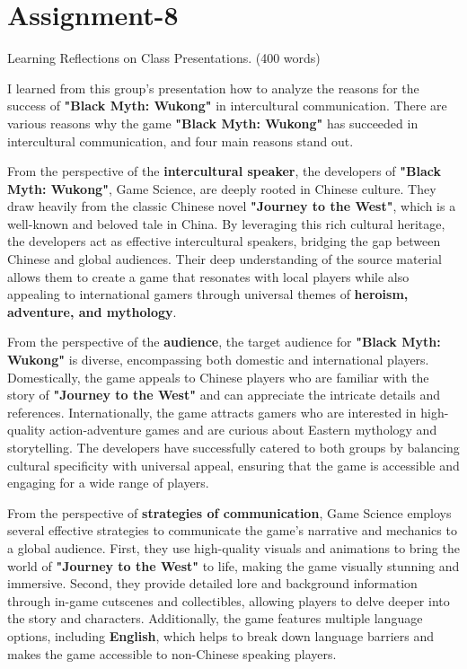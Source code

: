 \section{Assignment-8}

\begin{question}
    Learning Reflections on Class Presentations. (400 words)
\end{question}

I learned from this group's presentation how to analyze the reasons for the success of \textbf{"Black Myth: Wukong"} in intercultural communication. There are various reasons why the game \textbf{"Black Myth: Wukong"} has succeeded in intercultural communication, and four main reasons stand out.

From the perspective of the \textbf{intercultural speaker}, the developers of \textbf{"Black Myth: Wukong"}, Game Science, are deeply rooted in Chinese culture. They draw heavily from the classic Chinese novel \textbf{"Journey to the West"}, which is a well-known and beloved tale in China. By leveraging this rich cultural heritage, the developers act as effective intercultural speakers, bridging the gap between Chinese and global audiences. Their deep understanding of the source material allows them to create a game that resonates with local players while also appealing to international gamers through universal themes of \textbf{heroism, adventure, and mythology}.

From the perspective of the \textbf{audience}, the target audience for \textbf{"Black Myth: Wukong"} is diverse, encompassing both domestic and international players. Domestically, the game appeals to Chinese players who are familiar with the story of \textbf{"Journey to the West"} and can appreciate the intricate details and references. Internationally, the game attracts gamers who are interested in high-quality action-adventure games and are curious about Eastern mythology and storytelling. The developers have successfully catered to both groups by balancing cultural specificity with universal appeal, ensuring that the game is accessible and engaging for a wide range of players.

From the perspective of \textbf{strategies of communication}, Game Science employs several effective strategies to communicate the game's narrative and mechanics to a global audience. First, they use high-quality visuals and animations to bring the world of \textbf{"Journey to the West"} to life, making the game visually stunning and immersive. Second, they provide detailed lore and background information through in-game cutscenes and collectibles, allowing players to delve deeper into the story and characters. Additionally, the game features multiple language options, including \textbf{English}, which helps to break down language barriers and makes the game accessible to non-Chinese speaking players.

